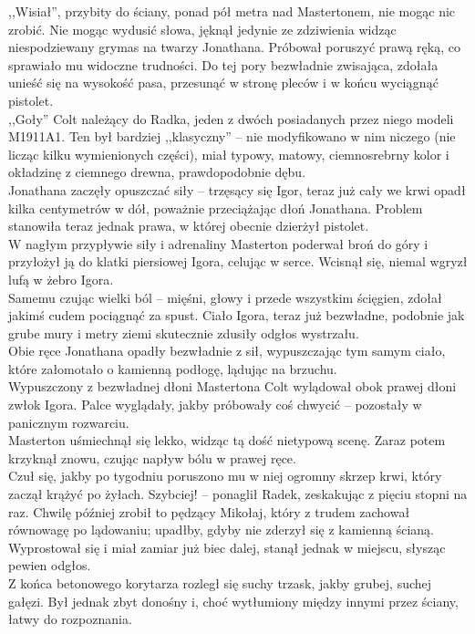 \documentclass[../MAIN.tex]{subfiles}
\begin{document}
,,Wisiał'', przybity do ściany, ponad pół metra nad Mastertonem, nie mogąc nic zrobić.
Nie mogąc wydusić słowa, jęknął jedynie ze zdziwienia widząc niespodziewany grymas na twarzy Jonathana. Próbował poruszyć prawą ręką, co sprawiało mu widoczne trudności. Do tej pory bezwładnie zwisająca, zdołała unieść się na wysokość pasa, przesunąć w stronę pleców i w końcu wyciągnąć pistolet.\\
,,Goły'' Colt należący do Radka, jeden z dwóch posiadanych przez niego modeli M1911A1. Ten był bardziej ,,klasyczny'' -- nie modyfikowano w nim niczego (nie licząc kilku wymienionych części), miał typowy, matowy, ciemnosrebrny kolor i okładzinę z ciemnego drewna, prawdopodobnie dębu.\\
Jonathana zaczęły opuszczać siły -- trzęsący się Igor, teraz już cały we krwi opadł kilka centymetrów w dół, poważnie przeciążając dłoń Jonathana. Problem stanowiła teraz jednak prawa, w której obecnie dzierżył pistolet.\\
W nagłym przypływie siły i adrenaliny Masterton poderwał broń do góry i przyłożył ją do klatki piersiowej Igora, celując w serce. Wcisnął się, niemal wgryzł lufą w żebro Igora.\\
Samemu czując wielki ból -- mięśni, głowy i przede wszystkim ścięgien, zdołał jakimś cudem pociągnąć za spust. Ciało Igora, teraz już bezwładne, podobnie jak grube mury i metry ziemi skutecznie zdusiły odgłos wystrzału.\\
Obie ręce Jonathana opadły bezwładnie z sił, wypuszczając tym samym ciało, które załomotało o kamienną podłogę, lądując na brzuchu.\\
Wypuszczony z bezwładnej dłoni Mastertona Colt wylądował obok prawej dłoni zwłok Igora. Palce wyglądały, jakby próbowały coś chwycić -- pozostały w panicznym rozwarciu.\\
Masterton uśmiechnął się lekko, widząc tą dość nietypową scenę. Zaraz potem krzyknął znowu, czując napływ bólu w prawej ręce.\\
Czuł się, jakby po tygodniu poruszono mu w niej ogromny skrzep krwi, który zaczął krążyć po żyłach.
\sx Szybciej! -- ponaglił Radek, zeskakując z pięciu stopni na raz.
\qd
Chwilę później zrobił to pędzący Mikołaj, który z trudem zachował równowagę po lądowaniu; upadłby, gdyby nie zderzył się z kamienną ścianą. Wyprostował się i miał zamiar już biec dalej, stanął jednak w miejscu, słysząc pewien odgłos.\\
Z końca betonowego korytarza rozległ się suchy trzask, jakby grubej, suchej gałęzi. Był jednak zbyt donośny i, choć wytłumiony między innymi przez ściany, łatwy do rozpoznania.\\
\end{document}

